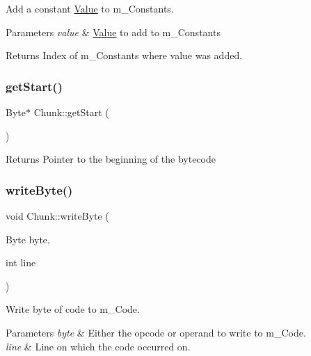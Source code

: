 Add a constant \hyperlink{class_value}{Value} to m\+\_\+\+Constants. 


\begin{DoxyParams}{Parameters}
{\em value} & \hyperlink{class_value}{Value} to add to m\+\_\+\+Constants \\
\hline
\end{DoxyParams}
\begin{DoxyReturn}{Returns}
Index of m\+\_\+\+Constants where value was added. 
\end{DoxyReturn}
\mbox{\label{class_chunk_a95d10e1f1a3d246fb045e81b20c9487d}} 
\subsubsection{\texorpdfstring{get\+Start()}{getStart()}}
{\footnotesize\ttfamily Byte$\ast$ Chunk\+::get\+Start (\begin{DoxyParamCaption}{ }\end{DoxyParamCaption})\hspace{0.3cm}{\ttfamily [inline]}}

\begin{DoxyReturn}{Returns}
Pointer to the beginning of the bytecode 
\end{DoxyReturn}
\mbox{\label{class_chunk_a825c5802ac179ab0aa45a2153b968f31}} 
\subsubsection{\texorpdfstring{write\+Byte()}{writeByte()}\hspace{0.1cm}{\footnotesize\ttfamily [1/2]}}
{\footnotesize\ttfamily void Chunk\+::write\+Byte (\begin{DoxyParamCaption}\item[{Byte}]{byte,  }\item[{int}]{line }\end{DoxyParamCaption})}



Write byte of code to m\+\_\+\+Code. 


\begin{DoxyParams}{Parameters}
{\em byte} & Either the opcode or operand to write to m\+\_\+\+Code. \\
\hline
{\em line} & Line on which the code occurred on. \\
\hline
\end{DoxyParams}
\mbox{\label{class_chunk_ae829323f6890ae5eddd48dc39d46455d}} 
